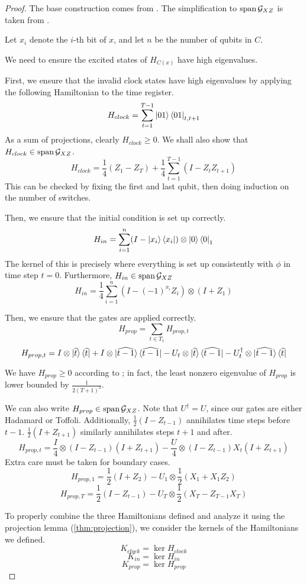 \begin{proof}
	The base construction comes from \cite{kitaev2002classical}. The simplification to $\operatorname*{\operatorname{span}}\mathcal{G}_{XZ}$ is taken from \cite{PhysRevA.78.012352}.

	Let $x_i$ denote the $i$-th bit of $x$, and let $n$ be the number of qubits in $C$.

	We need to ensure the excited states of $H_{C(x)}$ have high eigenvalues.

	First, we ensure that the invalid clock states have high eigenvalues by applying the following Hamiltonian to the time register.
	$$H_{clock}=\sum_{t=1}^{T-1}\ket{01}\bra{01}_{t,t+1}$$
	As a sum of projections, clearly $H_{clock}\geq 0$. We shall also show that $H_{clock}\in\operatorname*{\operatorname{span}}\mathcal{G}_{XZ}$.
	$$H_{clock}=\frac{1}{4}(Z_1 - Z_T) + \frac{1}{4}\sum_{t=1}^{T-1}(I-Z_tZ_{t+1}) $$
	This can be checked by fixing the first and last qubit, then doing induction on the number of switches.

	Then, we ensure that the initial condition is set up correctly.
	$$H_{in}=\sum_{i=1}^n(I-\ket{x_i}\bra{x_i})\otimes\ket{0}\bra{0}_1$$
	The kernel of this is precisely where everything is set up consistently with $\phi$ in time step $t=0$. Furthermore, $H_{in}\in\operatorname*{\operatorname{span}}\mathcal{G}_{XZ}$
	$$H_{in}=\frac{1}{4}\sum_{i=1}^n(I-(-1)^{x_i}Z_i)\otimes(I+Z_1)$$

	Then, we ensure that the gates are applied correctly.
	$$H_{prop}=\sum_{t\in T_1}H_{prop,t}$$
	$$H_{prop,t}=I\otimes\ket{\widehat{t}}\bra{\widehat{t}}
	+I\otimes\ket{\widehat{t-1}}\bra{\widehat{t-1}}
	-U_t\otimes\ket{\widehat{t}}\bra{\widehat{t-1}}
	-U_t^\dagger\otimes\ket{\widehat{t-1}}\bra{\widehat{t}}$$

	We have $H_{prop}\geq 0$ according to \cite{2002quant.ph.10077A}; in fact, the least nonzero eigenvalue of $H_{prop}$ is lower bounded by $\frac{1}{2(T+1)^2}$.

	We can also write $H_{prop}\in\operatorname*{\operatorname{span}}\mathcal{G}_{XZ}$. Note that $U^\dagger=U$, since our gates are either Hadamard or Toffoli.
	Additionally, $\frac{1}{2}(I-Z_{t-1})$ annihilates time steps before $t-1$. $\frac{1}{2}(I+Z_{t+1})$ similarly annihilates steps $t+1$ and after.
	$$H_{prop,t}=\frac{I}{4}\otimes(I-Z_{t-1})(I+Z_{t+1})-\frac{U}{4}\otimes(I-Z_{t-1})X_t(I+Z_{t+1})$$
	Extra care must be taken for boundary cases.
	$$H_{prop,1}=\frac{1}{2}(I+Z_2)-U_1\otimes\frac{1}{2}(X_1+X_1Z_2)$$
	$$H_{prop,T}=\frac{1}{2}(I-Z_{t-1})-U_T\otimes\frac{1}{2}(X_T-Z_{T-1}X_T)$$

	To properly combine the three Hamiltonians defined and analyze it using the projection lemma (\cref{thm:projection}), we consider the kernels of the Hamiltonians we defined.
	$$K_{clock}=\ker H_{clock}$$
	$$K_{in}=\ker H_{in}$$
	$$K_{prop}=\ker H_{prop}$$


\end{proof}
